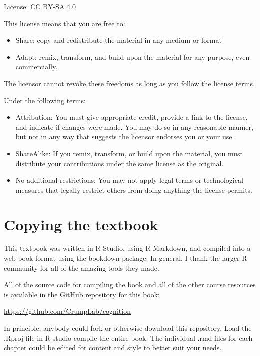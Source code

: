 \documentclass[
  oneside,
  12pt]{crumpbook}
\providecommand{\tightlist}{%
  \setlength{\itemsep}{0pt}\setlength{\parskip}{0pt}}
\begin{document}
\href{https://creativecommons.org/licenses/by-sa/4.0/}{License: CC BY-SA 4.0}

This license means that you are free to:

\begin{itemize}
\tightlist
\item
  Share: copy and redistribute the material in any medium or format
\item
  Adapt: remix, transform, and build upon the material for any purpose, even commercially.
\end{itemize}

The licensor cannot revoke these freedoms as long as you follow the license terms.

Under the following terms:

\begin{itemize}
\tightlist
\item
  Attribution: You must give appropriate credit, provide a link to the license, and indicate if changes were made. You may do so in any reasonable manner, but not in any way that suggests the licensor endorses you or your use.
\item
  ShareAlike: If you remix, transform, or build upon the material, you must distribute your contributions under the same license as the original.
\item
  No additional restrictions: You may not apply legal terms or technological measures that legally restrict others from doing anything the license permits.
\end{itemize}

\hypertarget{copying-the-textbook}{%
\section{Copying the textbook}\label{copying-the-textbook}}

This textbook was written in R-Studio, using R Markdown, and compiled into a web-book format using the bookdown package. In general, I thank the larger R community for all of the amazing tools they made.

All of the source code for compiling the book and all of the other course resources is available in the GitHub repository for this book:

\url{https://github.com/CrumpLab/cognition}

In principle, anybody could fork or otherwise download this repository. Load the .Rproj file in R-studio compile the entire book. The individual .rmd files for each chapter could be edited for content and style to better suit your needs.
\end{document}
